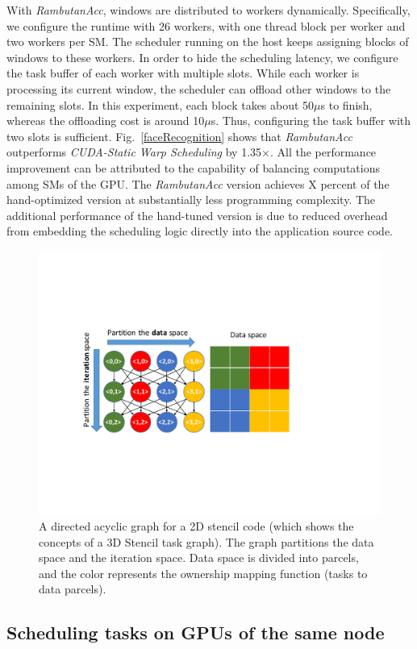 With {\em RambutanAcc}, windows are distributed to workers dynamically.
Specifically, we configure the runtime with 26 workers, with one thread block per worker and two workers per SM.
The scheduler running on the host keeps assigning blocks of windows to these workers.
In order to hide the scheduling latency, we configure the task buffer of each worker with multiple slots.
While each worker is processing its current window, the scheduler can offload other windows to the remaining slots.
In this experiment, each block takes about 50$\mu$s to finish, whereas the offloading cost is around 10$\mu$s.
Thus, configuring the task buffer with two slots is sufficient.
Fig.~\ref{faceRecognition} shows that {\em RambutanAcc} outperforms {\em CUDA-Static Warp Scheduling} by 1.35$\times$.
All the performance improvement can be attributed to the capability of balancing computations among SMs of the GPU.
The {\em RambutanAcc} version achieves X percent of the hand-optimized version at substantially less programming complexity.
The additional performance of the hand-tuned version is due to reduced overhead from embedding the scheduling logic directly into the application source code.


\begin{figure}[htb]
\centering
\includegraphics[width=.47\textwidth]{figures/taskGraph.pdf}
\caption{A directed acyclic graph for a 2D stencil code (which shows the concepts of a 3D Stencil task graph). The graph partitions the data space and the iteration space. Data space is divided into parcels, and the color represents the ownership mapping function (tasks to data parcels).}
\label{fig:taskGraph}
\end{figure}


\subsection{Scheduling tasks on GPUs of the same node}


